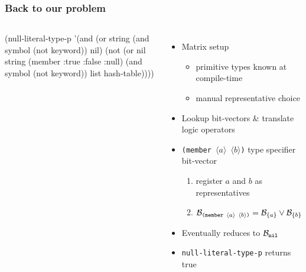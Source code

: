 \documentclass[aspectratio=169]{beamer}
\renewcommand\code[1]{\texttt{#1}}
\newcommand\plholder[1]{\ensuremath{\langle {#1} \rangle}}
\newcommand\emoji[2][\tiny]{{#1#2}}
\begin{document}
\begin{frame}[fragile]
  \frametitle{Back to our problem}
  \newcommand\bv[1]{\ensuremath{\mathcal B_{\code{\scriptsize#1}}}}
  \begin{columns}
\begin{smallclcode}
(null-literal-type-p
 '(and (or string
           (and symbol
                (not keyword))
           nil)
       (not (or nil
                string
                (member :true
                        :false
                        :null)
                (and symbol
                     (not keyword))
                list
                hash-table))))
\end{smallclcode}

    \begin{itemize}
    \item<2-> Matrix setup
      \begin{itemize}
      \item primitive types known at compile-time
      \item manual representative choice
      \end{itemize}
    \item<4-> Lookup bit-vectors \& translate logic operators
    \item<11-> \code{(member \plholder a \plholder b)} type
      specifier bit-vector
      \begin{enumerate}
      \item register $a$ and $b$ as representatives
      \item \(
        \bv{(member \plholder a \plholder b)} =
        \bv{$\{a\}$} \vee \bv{$\{b\}$}
        \)
      \end{enumerate}
    \item<13-> Eventually reduces to \bv{nil}
    \item<13-> \code{null-literal-type-p} returns true
    \end{itemize}
  \end{columns}


\end{frame}
\end{document}
